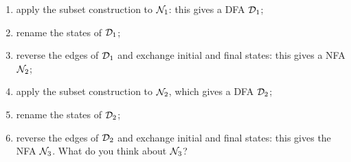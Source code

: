 
 \begin{enumerate}

    \item apply the subset construction to \({\cal N}_1\): this gives
      a DFA \({\cal D}_1\);

    \item rename the states of \({\cal D}_1\);

    \item reverse the edges of \({\cal D}_1\) and exchange initial and
      final states: this gives a NFA \({\cal N}_2\);

    \item apply the subset construction to \({\cal N}_2\), which gives
      a DFA \({\cal D}_2\);

    \item rename the states of \({\cal D}_2\);

    \item reverse the edges of \({\cal D}_2\) and exchange initial and
      final states: this gives the NFA \({\cal N}_3\). What do you
      think about \({\cal N}_3\)?

 \end{enumerate}
